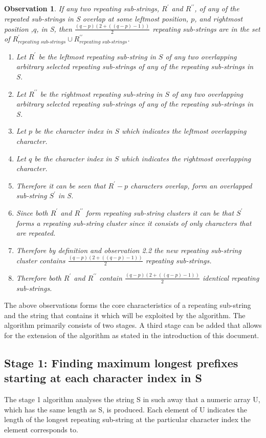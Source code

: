 \documentclass[12pt]{article}
\newtheorem{obser}{Observation}[section]
\begin{document}
\begin{flushleft}
	\begin{obser}
	If any two repeating sub-strings, $R^{\prime}$ and $R^{\prime\prime}$, of any of the repeated sub-strings in S overlap at some leftmost position, $p$, and rightmost position ,$q$, in S, then $\frac{(q - p)(2 + ((q - p)-1))}{2}$ repeating sub-strings are in the set of $R^{\prime}_{\textit{repeating sub-strings}} \cup R^{\prime\prime}_{\textit{repeating sub-strings}}$.
		\begin{enumerate}
			\item Let $R^{\prime}$ be the leftmost repeating sub-string in $S$ of any two overlapping arbitrary selected repeating sub-strings of any of the repeating sub-strings in S.  
			\item Let $R^{\prime\prime}$ be the rightmost repeating sub-string in $S$ of any two overlapping arbitrary selected repeating sub-strings of any of the repeating sub-strings in S.
			\item Let $p$ be the character index in $S$ which indicates the leftmost overlapping character.
			\item Let $q$ be the character index in $S$ which indicates the rightmost overlapping character.
			\item Therefore it can be seen that $R^{\prime} - p$ characters overlap, form an overlapped sub-string $S^{\prime}$ in S.
			\item Since both $R^{\prime}$ and $R^{\prime\prime}$ form repeating sub-string clusters it can be that $S^{\prime}$ forms a repeating sub-string cluster since it consists of only characters that are repeated.
			\item Therefore by definition and observation 2.2 the new repeating sub-string cluster contains $\frac{(q - p)(2 + ((q - p)-1))}{2}$ repeating sub-strings.
			\item Therefore both $R^{\prime}$ and $R^{\prime\prime}$ contain $\frac{(q - p)(2 + ((q - p)-1))}{2}$ identical repeating sub-strings.
		\end{enumerate}
	\end{obser}
	
	The above observations forms the core characteristics of a repeating sub-string and the string that contains it which will be exploited by the algorithm. The algorithm primarily consists of two stages. A third stage can be added that allows for the extension of the algorithm as stated in the introduction of this document.
	
	\subsection{Stage 1: Finding maximum longest prefixes starting at each character index in S}
		The stage 1 algorithm analyses the string S in such away that a numeric array U, which has the same length as S, is produced. Each element of U indicates the length of the longest repeating sub-string at the particular character index the element corresponds to. 
	

\end{flushleft}
\end{document}
